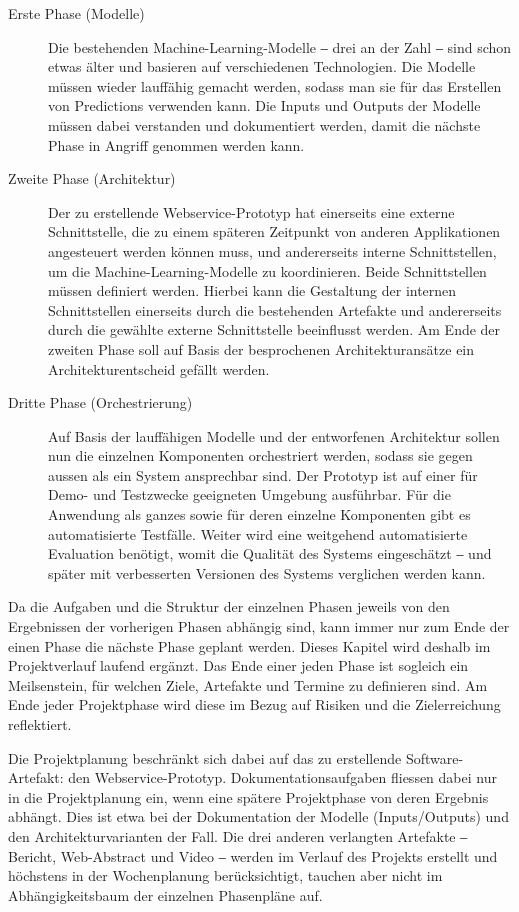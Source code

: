 \begin{description}
    \item[Erste Phase (Modelle)] Die bestehenden Machine-Learning-Modelle ‒ drei an der Zahl ‒ sind schon etwas älter und basieren auf verschiedenen Technologien. Die Modelle müssen wieder lauffähig gemacht werden, sodass man sie für das Erstellen von Predictions verwenden kann. Die Inputs und Outputs der Modelle müssen dabei verstanden und dokumentiert werden, damit die nächste Phase in Angriff genommen werden kann.
    \item[Zweite Phase (Architektur)] Der zu erstellende Webservice-Prototyp hat einerseits eine externe Schnittstelle, die zu einem späteren Zeitpunkt von anderen Applikationen angesteuert werden können muss, und andererseits interne Schnittstellen, um die Machine-Learning-Modelle zu koordinieren. Beide Schnittstellen müssen definiert werden. Hierbei kann die Gestaltung der internen Schnittstellen einerseits durch die bestehenden Artefakte und andererseits durch die gewählte externe Schnittstelle beeinflusst werden. Am Ende der zweiten Phase soll auf Basis der besprochenen Architekturansätze ein Architekturentscheid gefällt werden.
\item[Dritte Phase (Orchestrierung)] Auf Basis der lauffähigen Modelle und der entworfenen Architektur sollen nun die einzelnen Komponenten orchestriert werden, sodass sie gegen aussen als ein System ansprechbar sind. Der Prototyp ist auf einer für Demo- und Testzwecke geeigneten Umgebung ausführbar. Für die Anwendung als ganzes sowie für deren einzelne Komponenten gibt es automatisierte Testfälle. Weiter wird eine weitgehend automatisierte Evaluation benötigt, womit die Qualität des Systems eingeschätzt ‒ und später mit verbesserten Versionen des Systems verglichen werden kann.
\end{description}

Da die Aufgaben und die Struktur der einzelnen Phasen jeweils von den Ergebnissen der vorherigen Phasen abhängig sind, kann immer nur zum Ende der einen Phase die nächste Phase geplant werden. Dieses Kapitel wird deshalb im Projektverlauf laufend ergänzt. Das Ende einer jeden Phase ist sogleich ein Meilsenstein, für welchen Ziele, Artefakte und Termine zu definieren sind. Am Ende jeder Projektphase wird diese im Bezug auf Risiken und die Zielerreichung reflektiert.

Die Projektplanung beschränkt sich dabei auf das zu erstellende Software-Artefakt: den Webservice-Prototyp. Dokumentationsaufgaben fliessen dabei nur in die Projektplanung ein, wenn eine spätere Projektphase von deren Ergebnis abhängt. Dies ist etwa bei der Dokumentation der Modelle (Inputs/Outputs) und den Architekturvarianten der Fall.  Die drei anderen verlangten Artefakte ‒ Bericht, Web-Abstract und Video ‒ werden im Verlauf des Projekts erstellt und höchstens in der Wochenplanung berücksichtigt, tauchen aber nicht im Abhängigkeitsbaum der einzelnen Phasenpläne auf.

